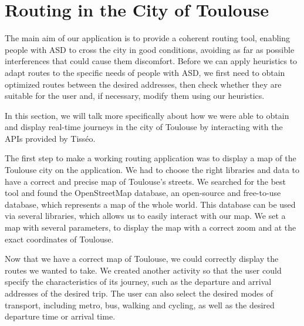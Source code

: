 \section{Routing in the City of Toulouse}

The main aim of our application is to provide a coherent routing tool, enabling people with ASD to cross the city in good conditions, avoiding as far as possible interferences that could cause them discomfort. Before we can apply heuristics to adapt routes to the specific needs of people with ASD, we first need to obtain optimized routes between the desired addresses, then check whether they are suitable for the user and, if necessary, modify them using our heuristics.



In this section, we will talk more specifically about how we were able to obtain and display real-time journeys in the city of Toulouse by interacting with the APIs provided by Tisséo.



The first step to make a working routing application was to display a map of the Toulouse city on the application. We had to choose the right libraries and data to have a correct and precise map of Toulouse's streets. We searched for the best tool and found the OpenStreetMap database, an open-source and free-to-use database, which represents a map of the whole world. This database can be used via several libraries, which allows us to easily interact with our map. We set a map with several parameters, to display the map with a correct zoom and at the exact coordinates of Toulouse.



Now that we have a correct map of Toulouse, we could correctly display the routes we wanted to take. We created another activity so that the user could specify the characteristics of its journey, such as the departure and arrival addresses of the desired trip. The user can also select the desired modes of transport, including metro, bus, walking and cycling, as well as the desired departure time or arrival time.



